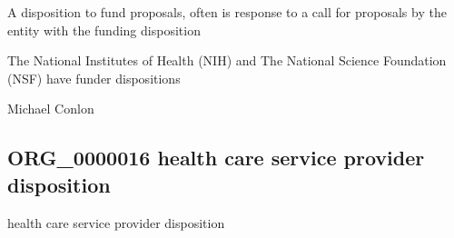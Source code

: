 \documentclass[letterpaper,10pt,english]{sphinxmanual}
\begin{document}
\begin{sphinxShadowBox}

\sphinxAtStartPar
A disposition to fund proposals, often is response to a call for proposals by the entity with the funding disposition
\end{sphinxShadowBox}

\begin{sphinxShadowBox}

\sphinxAtStartPar
{}
\end{sphinxShadowBox}

\begin{sphinxShadowBox}

\sphinxAtStartPar
The National Institutes of Health (NIH) and The National Science Foundation (NSF) have funder dispositions
\end{sphinxShadowBox}

\begin{sphinxShadowBox}

\sphinxAtStartPar
{}
\end{sphinxShadowBox}

\begin{sphinxShadowBox}

\sphinxAtStartPar
Michael Conlon 
\end{sphinxShadowBox}
\begin{quote}

\ignorespaces \end{quote}


\subsection{ORG\_0000016 \sphinxhyphen{} health care service provider disposition}
\label{\detokenize{doc-ORG_0000016:org-0000016-health-care-service-provider-disposition}}\label{\detokenize{doc-ORG_0000016:index-0}}\label{\detokenize{doc-ORG_0000016::doc}}
\begin{sphinxShadowBox}

\sphinxAtStartPar
health care service provider disposition
\end{sphinxShadowBox}
\end{document}
